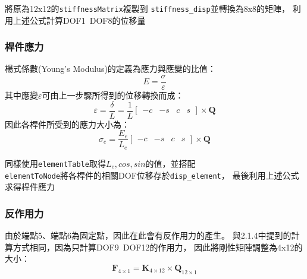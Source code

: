 \documentclass[12pt,a4paper]{article}
\begin{document}
            將原為12x12的\texttt{stiffnessMatrix}複製到
            \texttt{stiffness\_disp}並轉換為8x8的矩陣，
            利用上述公式計算DOF1~DOF8的位移量
            

        \subsubsection{桿件應力}

            楊式係數(Young's Modulus)的定義為應力與應變的比值：
            \begin{displaymath}
                E = \frac{\sigma}{\varepsilon}
            \end{displaymath}
            其中應變$\varepsilon$可由上一步驟所得到的位移轉換而成：
            \begin{displaymath}
                \varepsilon = \frac{\delta}{L} = \frac{1}{L}\left[
                \begin{array}{cccc}
                    -c & -s & c & s
                \end{array}
                \right]\times\mathbf{Q}
            \end{displaymath}
            因此各桿件所受到的應力大小為：
            \begin{displaymath}
                \sigma_e = \frac{E_e}{L_e}\left[
                    \begin{array}{cccc}
                        -c & -s & c & s
                    \end{array}
                    \right]\times\mathbf{Q}
            \end{displaymath}

            同樣使用\texttt{elementTable}取得$L_e,cos,sin$的值，並搭配\\
            \texttt{elementToNode}將各桿件的相關DOF位移存於\texttt{disp\_element}，
            最後利用上述公式求得桿件應力
            
            
        \subsubsection{反作用力}

            由於端點5、端點6為固定點，因此在此會有反作用力的產生。
            與2.1.4中提到的計算方式相同，因為只計算DOF9~DOF12的作用力，
            因此將剛性矩陣調整為4x12的大小：
            \begin{displaymath}
                \mathbf{F}_{4\times1} = \mathbf{K}_{4\times12}\times\mathbf{Q}_{12\times1}
            \end{displaymath}
\end{document}

